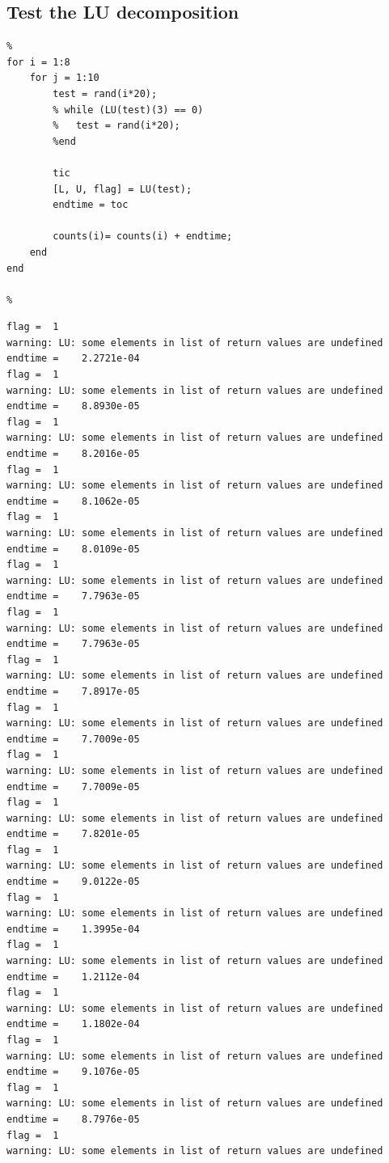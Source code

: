 \documentclass[10pt]{article}
\begin{document}
{}
\subsection*{Test the LU decomposition}

\begin{lstlisting}
%
for i = 1:8
	for j = 1:10
		test = rand(i*20);
		% while (LU(test)(3) == 0)
		% 	test = rand(i*20);
		%end

		tic
		[L, U, flag] = LU(test);
		endtime = toc

		counts(i)= counts(i) + endtime;
	end
end

%
\end{lstlisting}
\begin{lstlisting}[language={},xleftmargin=5pt,frame=none]
flag =  1
warning: LU: some elements in list of return values are undefined
endtime =    2.2721e-04
flag =  1
warning: LU: some elements in list of return values are undefined
endtime =    8.8930e-05
flag =  1
warning: LU: some elements in list of return values are undefined
endtime =    8.2016e-05
flag =  1
warning: LU: some elements in list of return values are undefined
endtime =    8.1062e-05
flag =  1
warning: LU: some elements in list of return values are undefined
endtime =    8.0109e-05
flag =  1
warning: LU: some elements in list of return values are undefined
endtime =    7.7963e-05
flag =  1
warning: LU: some elements in list of return values are undefined
endtime =    7.7963e-05
flag =  1
warning: LU: some elements in list of return values are undefined
endtime =    7.8917e-05
flag =  1
warning: LU: some elements in list of return values are undefined
endtime =    7.7009e-05
flag =  1
warning: LU: some elements in list of return values are undefined
endtime =    7.7009e-05
flag =  1
warning: LU: some elements in list of return values are undefined
endtime =    7.8201e-05
flag =  1
warning: LU: some elements in list of return values are undefined
endtime =    9.0122e-05
flag =  1
warning: LU: some elements in list of return values are undefined
endtime =    1.3995e-04
flag =  1
warning: LU: some elements in list of return values are undefined
endtime =    1.2112e-04
flag =  1
warning: LU: some elements in list of return values are undefined
endtime =    1.1802e-04
flag =  1
warning: LU: some elements in list of return values are undefined
endtime =    9.1076e-05
flag =  1
warning: LU: some elements in list of return values are undefined
endtime =    8.7976e-05
flag =  1
warning: LU: some elements in list of return values are undefined

\end{lstlisting}
\end{document}
